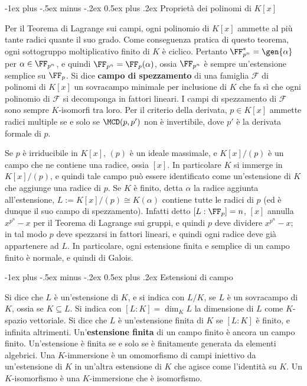 \documentclass[10pt,landscape]{article}
\makeatletter
\renewcommand{\section}{\@startsection{section}{1}{0mm}%
	{-1ex plus -.5ex minus -.2ex}%
	{0.5ex plus .2ex}%
	{\normalfont\large\bfseries}}
\makeatother
\begin{document}
\begin{multicols}{3}
		\section{Proprietà dei polinomi di $K[x]$}
		
		Per il Teorema di Lagrange sui campi, ogni polinomio
		di $K[x]$ ammette al più tante radici quante il suo grado.
		Come conseguenza pratica di questo teorema, ogni sottogruppo
		moltiplicativo finito di $K$ è ciclico. Pertanto
		$\FF_{p^n}^* = \gen{\alpha}$ per $\alpha \in \FF_{p^n}$,
		e quindi $\FF_{p^n} = \FF_p(\alpha)$, ossia
		$\FF_{p^n}$ è sempre un'estensione semplice su $\FF_p$. Si dice
		\textbf{campo di spezzamento} di una famiglia $\mathcal{F}$
		di polinomi di $K[x]$ un sovracampo minimale per
		inclusione di $K$ che fa sì che ogni polinomio di $\mathcal{F}$ si decomponga in fattori lineari. I campi
		di spezzamento di $\mathcal{F}$ sono sempre
		$K$-isomorfi tra loro. Per il criterio della derivata,
		$p \in K[x]$ ammette radici multiple se e solo se
		$\MCD(p, p')$ non è invertibile, dove $p'$ è la derivata
		formale di $p$. \medskip
		
		
		Se $p$ è irriducibile in $K[x]$, $(p)$ è un ideale
		massimale, e $K[x] / (p)$ è un campo che
		ne contiene una radice, ossia $[x]$. In
		particolare $K$ si immerge in $K[x] / (p)$,
		e quindi tale campo può essere identificato come
		un'estensione di $K$ che aggiunge una radice di $p$.
		Se $K$ è finito, detta $\alpha$ la radice aggiunta
		all'estensione, $L := K[x] / (p) \cong K(\alpha)$ contiene
		tutte le radici di $p$ (ed è dunque il suo campo
		di spezzamento). Infatti detto $[L : \FF_p] = n$,
		$[x]$ annulla $x^{p^n}-x$ per il Teorema di Lagrange
		sui gruppi, e quindi $p$ deve dividere $x^{p^n}-x$;
		in tal modo $p$ deve spezzarsi in fattori lineari,
		e quindi ogni radice deve già appartenere ad $L$.
		In particolare, ogni estensione finita e semplice
		di un campo finito è normale, e quindi di Galois. \medskip
		
		\section{Estensioni di campo}
		
		
		Si dice che $L$ è un'estensione di $K$, e si indica
		con $L / K$, se $L$ è un sovracampo di $K$,
		ossia se $K \subseteq L$. Si indica con $[L : K] = \dim_K L$ la
		dimensione di $L$ come $K$-spazio vettoriale. Si
		dice che $L$ è un'estensione finita di $K$ se $[L : K]$
		è finito, e infinita altrimenti. Un'\textbf{estensione finita}
		di un campo finito è ancora un campo finito. Un'estensione
		è finita se e solo se è finitamente generata da elementi algebrici. Una $K$-immersione è un omomorfismo di campi
		iniettivo da un'estensione di $K$ in un'altra estensione di $K$ che
		agisce come l'identità su $K$. Un $K$-isomorfismo è
		una $K$-immersione che è isomorfismo. \medskip
		

\end{multicols}
\end{document}
